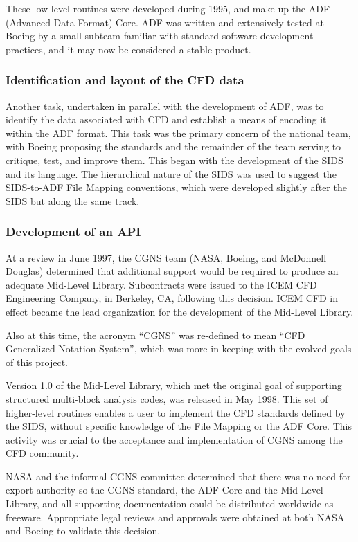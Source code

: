 These low-level routines were developed during 1995, and make up the
ADF (Advanced Data Format) Core.
ADF was written and extensively tested at Boeing by a small subteam
familiar with standard software development practices, and it may now be
considered a stable product.

\subsubsection{Identification and layout of the CFD data}

Another task, undertaken in parallel with the development of ADF, was to
identify the data associated with CFD and establish a means of encoding
it within the ADF format.
This task was the primary concern of the national team, with Boeing
proposing the standards and the remainder of the team serving to
critique, test, and improve them.
This began with the development of the SIDS and its language.
The hierarchical nature of the SIDS was used to suggest the SIDS-to-ADF
File Mapping conventions, which were developed slightly after the SIDS
but along the same track.

\subsubsection{Development of an API}

At a review in June 1997, the CGNS team (NASA, Boeing, and McDonnell
Douglas) determined that additional support would be required to produce
an adequate Mid-Level Library.
Subcontracts were issued to the ICEM CFD Engineering Company, in
Berkeley, CA, following this decision.
ICEM CFD in effect became the lead organization for the development of
the Mid-Level Library.

Also at this time, the acronym ``CGNS'' was re-defined to mean ``CFD
Generalized Notation System'', which was more in keeping with the evolved
goals of this project.

Version 1.0 of the Mid-Level Library, which met the original goal of
supporting structured multi-block analysis codes, was released in May
1998.
This set of higher-level routines enables a user to implement the CFD
standards defined by the SIDS, without specific knowledge of the File
Mapping or the ADF Core.
This activity was crucial to the acceptance and implementation of CGNS
among the CFD community.

NASA and the informal CGNS committee determined that there was no
need for export authority so the CGNS standard, the ADF Core and the
Mid-Level Library, and all supporting documentation could be distributed
worldwide as freeware.
Appropriate legal reviews and approvals were obtained at both NASA and
Boeing to validate this decision.

